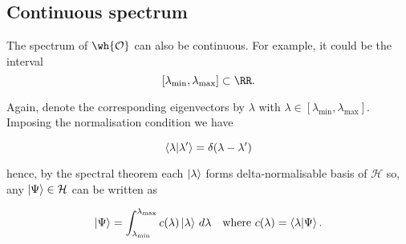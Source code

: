 \documentclass[12pt, a4paper]{article}
\begin{document}
\subsection{Continuous spectrum}

The spectrum of \(\wh{\mathcal{O}}\) can also be continuous. For example, it could be the interval 
\[[\lambda_{\min}, \lambda_{\max}] \subset \RR.\]

Again, denote the corresponding eigenvectors by \(\lambda\) with \(\lambda \in [\lambda_{\min}, \lambda_{\max}]\). Imposing the normalisation condition we have 

\[\bra{\lambda} \ket{\lambda'} = \delta(\lambda-\lambda')\]

hence, by the spectral theorem each \(\ket{\lambda}\) forms delta-normalisable basis of \(\mathcal{H}\) so, any \(\ket{\Psi} \in \mathcal{H}\) can be written as 

\[\ket{\Psi} = \int_{\lambda_{\min}}^{\lambda_{\max}} c(\lambda) \ket{\lambda} \, d\lambda \quad \text{where } c(\lambda)=\bra{\lambda} \ket{\Psi}.\]
\end{document}
